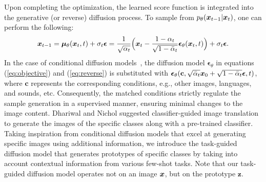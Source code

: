 Upon completing the optimization, the learned score function is integrated into the generative (or reverse) diffusion process. To sample from $p_\theta({\boldsymbol x}_{t-1}|{\boldsymbol x}_t)$, one can perform the following:
\begin{align}\label{eq:reverse}
    {\boldsymbol x}_{t-1}=   {\boldsymbol\mu}_\theta({\boldsymbol x}_t,t)+\sigma_t\boldsymbol{\epsilon}=\frac{1}{\sqrt{\alpha_t}}\Big{(}{\boldsymbol x}_t-\frac{1-\alpha_t}{\sqrt{1-\bar{\alpha}_t}}\boldsymbol{\epsilon}_\theta({\boldsymbol x}_t,t)\Big{)}+\sigma_t\boldsymbol{\epsilon}.
\end{align}
%
In the case of conditional diffusion models~\cite{saharia2022palette,sasaki2021unit, kwon2022diffusion}, the diffusion model $\boldsymbol{\epsilon}_\theta$ in equations (\ref{eq:objective}) and (\ref{eq:reverse}) is substituted with $\boldsymbol{\epsilon}_\theta(\mathbf{c}, \sqrt{\bar{\alpha}_t}{\boldsymbol x}_0 + \sqrt{1 - \bar{\alpha}_t}\boldsymbol{\epsilon}, t)$, where $\mathbf{c}$ represents the corresponding conditions, e.g., other images, languages, and sounds, etc.
Consequently, the matched conditions strictly regulate the sample generation in a supervised manner, ensuring minimal changes to the image content.
Dhariwal and Nichol \cite{dhariwal2021diffusion} suggested classifier-guided image translation to generate the images of the specific classes along with a pre-trained classifier.
Taking inspiration from conditional diffusion models that excel at generating specific images using additional information, we introduce the task-guided diffusion model that generates prototypes of specific classes by taking into account contextual information from various few-shot tasks. Note that our task-guided diffusion model operates not on an image ${\boldsymbol x}$, but on the prototype $\mathbf{z}$. 